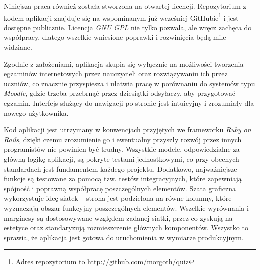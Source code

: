 \documentclass[12pt,twoside]{report}
\begin{document}
Niniejsza praca również została stworzona na otwartej licencji.
Repozytorium z kodem aplikacji znajduje się na wspominanym już wcześniej
GitHubie\footnote{Adres repozytorium to \url{http://github.com/morgoth/quiz}} i jest dostępne
publicznie. Licencja \emph{GNU GPL} nie tylko pozwala, ale wręcz zachęca do współpracy,
dlatego wszelkie wniesione poprawki i rozwinięcia będą mile widziane.


Zgodnie z założeniami, aplikacja skupia się wyłącznie na możliwości tworzenia egzaminów
internetowych przez nauczycieli oraz rozwiązywaniu ich przez uczniów, co znacznie
przyspiesza i ułatwia pracę w porównaniu do systemów typu \emph{Moodle}, gdzie trzeba
przebrnąć przez dziesiątki odsyłaczy, aby przygotować egzamin. Interfejs służący do
nawigacji po stronie jest intuicyjny i zrozumiały dla nowego użytkownika.


Kod aplikacji jest utrzymany w konwencjach przyjętych we frameworku \emph{Ruby on Rails},
dzięki czemu zrozumienie go i ewentualny przyszły rozwój przez innych programistów nie
powinien być trudny. Wszystkie modele, odpowiedzialne za główną logikę aplikacji, są pokryte
testami jednostkowymi, co przy obecnych standardach jest fundamentem każdego projektu.
Dodatkowo, najważniejsze funkcje są testowane za pomocą tzw. testów integracyjnych, które
zapewniają spójność i poprawną współpracę poszczególnych elementów.
Szata graficzna wykorzystuje ideę siatek -- strona jest podzielona na równe kolumny, które
wyznaczają obszar funkcyjny poszczególnych elementów. Wszelkie wyrównania i marginesy są
dostosowywane względem zadanej siatki, przez co zyskują na estetyce oraz standaryzują
rozmieszczenie głównych komponentów.
Wszystko to sprawia, że aplikacja jest gotowa do uruchomienia w wymiarze produkcyjnym.

\cleardoublepage
\listoflisting

\newpage
\listoffigures
\listoftables

\newpage


\end{document}
